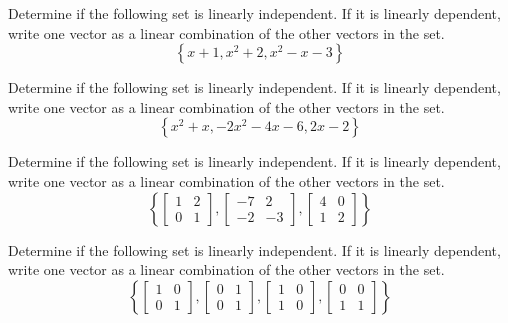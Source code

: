 \documentclass{ximera}
\begin{document}
\begin{problem}\label{prb:10.52} Determine if the following set is linearly independent. If it is linearly dependent, write one vector as a linear combination of the other vectors in the set.
\[
\left\{ x+1, x^2 + 2, x^2 - x -3 \right\}
\]
\end{problem}

\begin{problem}\label{prb:10.53} Determine if the following set is linearly independent. If it is linearly dependent, write one vector as a linear combination of the other vectors in the set.
\[
\left\{ x^2 + x, -2x^2 -4x -6 , 2x - 2 \right\}
\]
\end{problem}

\begin{problem}\label{prb:10.54} Determine if the following set is linearly independent. If it is linearly dependent, write one vector as a linear combination of the other vectors in the set.
\[
\left\{ \left[ \begin{array}{rr}
1 & 2 \\
0 & 1
\end{array} \right], \left[ \begin{array}{rr}
-7 & 2 \\
-2 & -3
\end{array} \right], \left[ \begin{array}{rr}
4 & 0 \\
1 & 2
\end{array} \right]
 \right\}
\]
\end{problem}

\begin{problem}\label{prb:10.55} Determine if the following set is linearly independent. If it is linearly dependent, write one vector as a linear combination of the other vectors in the set.
\[
\left\{ \left[ \begin{array}{rr}
1 & 0 \\
0 & 1
\end{array} \right], \left[ \begin{array}{rr}
0 & 1 \\
0 & 1
\end{array} \right], \left[ \begin{array}{rr}
1 & 0 \\
1 & 0
\end{array} \right], \left[ \begin{array}{rr}
0 & 0 \\
1 & 1
\end{array} \right]
 \right\}
\]
\end{problem}
\end{document}
